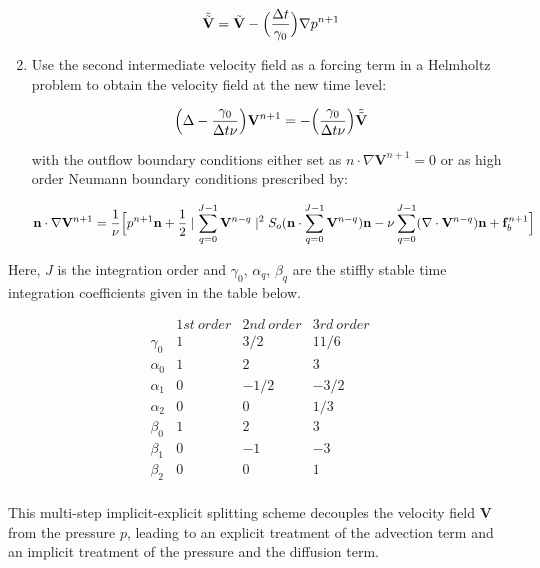 \begin{enumerate}
\begin{equation}
 \tilde{\tilde{\mathbf{V}}}=\tilde{\mathbf{V}}-\Bigl(\frac{\Delta t}{\gamma_0}\Bigr)\nabla p^{n+1}
\end{equation}

 \item Use the second intermediate velocity field as a forcing term in a Helmholtz problem to obtain the velocity field at the new time level:

 \begin{equation}
  \Bigl(\Delta-\frac{\gamma_0}{\Delta t \nu}\Bigr)\mathbf{V}^{n+1}=-\Bigl(\frac{\gamma_0}{\Delta t \nu}\Bigr)\tilde{\tilde{\mathbf{V}}}
 \end{equation}

with the outflow boundary conditions either set as $n\cdot\nabla\mathbf{V}^{n+1}=0$ or as high order Neumann boundary conditions prescribed by\cite{DoKa14}:

 \begin{equation}
 \mathbf{n}\cdot\nabla\mathbf{V}^{n+1}=\frac{1}{\nu}\Bigl[p^{n+1}\mathbf{n}+\frac{1}{2}
   \mid\sum_{q=0}^{J-1} \mathbf{V}^{n-q} \mid^2 S_o(\mathbf{n}\cdot
   \sum_{q=0}^{J-1}\mathbf{V}^{n-q})\mathbf{n}-\nu\sum_{q=0}^{J-1}(\nabla\cdot\mathbf{V}^{n-q})\mathbf{n}+\mathbf{f}_b^{n+1}\Bigr]
 \end{equation}

 \end{enumerate}

Here, $J$ is the integration order and $\gamma_0$, $\alpha_q$, $\beta_q$
are the stiffly stable time integration coefficients given in the table below.

\begin{equation}
 \begin{array}{cccc}
  & 1st\ order & 2nd\ order & 3rd\ order \\
 \gamma_0 & 1 & 3/2 & 11/6\\
 \alpha_0 & 1 & 2 & 3\\
 \alpha_1 & 0 & -1/2 & -3/2\\
 \alpha_2 & 0 & 0 & 1/3\\
 \beta_0 & 1 & 2 & 3\\
 \beta_1 & 0 & -1 & -3\\
 \beta_2 & 0 & 0 & 1\\
 \end{array}
 \end{equation}

 This multi-step implicit-explicit splitting scheme decouples the velocity field $\mathbf{V}$ from the pressure $p$, leading to an
explicit treatment of the advection term and an implicit treatment of the pressure and the diffusion term.

